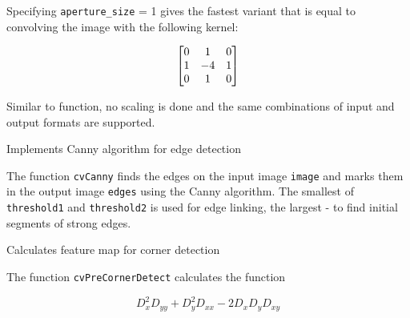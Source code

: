 Specifying \texttt{aperture\_size} = 1 gives the fastest variant that is equal to convolving the image with the following kernel:

\[ \begin{bmatrix} 0 & 1 & 0\\ 1 & -4 & 1\\ 0 & 1 & 0 \end{bmatrix} \]

Similar to  function, no scaling is done and the same combinations of input and output formats are supported.

\label{Canny}
Implements Canny algorithm for edge detection

\begin{description}
\end{description}

The function \texttt{cvCanny} finds the edges on the input image \texttt{image} and marks them in the output image \texttt{edges} using the Canny algorithm. The smallest of \texttt{threshold1} and \texttt{threshold2} is used for edge linking, the largest - to find initial segments of strong edges.

\label{PreCornerDetect}
Calculates feature map for corner detection

\begin{description}
\end{description}

The function \texttt{cvPreCornerDetect} calculates the function

\[
D_x^2 D_{yy} + D_y^2 D_{xx} - 2 D_x D_y D_{xy}
\]

